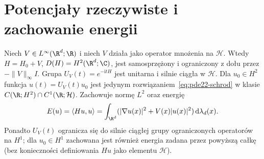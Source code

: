 \section{Potencjały rzeczywiste i zachowanie energii}
\begin{twierdzenie}\label{thm:pde22-potential}
Niech $V\in L^\infty(\R^d;\R)$ i niech $V$ działa jako
operator mnożenia na $\mathcal H$. Wtedy
$H=H_0+V$, $D(H)=H^2(\R^d;\C)$, jest samosprzężony
i ograniczony z dołu przez $-\|V\|_\infty I$.
Grupa $U_V(t)=e^{-\mathrm itH}$ jest unitarna
i silnie ciągła w $\mathcal H$.
Dla $u_0\in H^2$ funkcja $u(t)=U_V(t)u_0$ jest
jedynym rozwiązaniem~\eqref{eq:pde22-schrod}
w klasie $C(\R;H^2)\cap C^1(\R;\mathcal H)$.
Zachowuje normę $L^2$ oraz energię
\[
 E(u)=\langle Hu,u\rangle
 =\int_{\R^d}(|\nabla u(x)|^2+V(x)|u(x)|^2)
       \,\mathrm d\lambda_d(x).
\]
Ponadto $U_V(t)$ ogranicza się do silnie ciągłej
grupy ograniczonych operatorów na $H^1$;
dla $u_0\in H^1$ zachowana jest również energia
zadana przez powyższą całkę (bez konieczności
definiowania $Hu$ jako elementu $\mathcal H$).
\end{twierdzenie}

